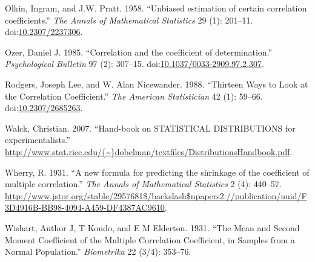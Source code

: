 \documentclass[]{article}
\begin{document}
\hypertarget{ref-Olkin1958}{}
Olkin, Ingram, and J.W. Pratt. 1958. ``Unbiased estimation of certain
correlation coefficients.'' \emph{The Annals of Mathematical Statistics}
29 (1): 201--11.
doi:\href{https://doi.org/10.2307/2237306}{10.2307/2237306}.

\hypertarget{ref-Ozer1985}{}
Ozer, Daniel J. 1985. ``Correlation and the coefficient of
determination.'' \emph{Psychological Bulletin} 97 (2): 307--15.
doi:\href{https://doi.org/10.1037/0033-2909.97.2.307}{10.1037/0033-2909.97.2.307}.

\hypertarget{ref-Rodgers1988}{}
Rodgers, Joseph Lee, and W. Alan Nicewander. 1988. ``Thirteen Ways to
Look at the Correlation Coefficient.'' \emph{The American Statistician}
42 (1): 59--66.
doi:\href{https://doi.org/10.2307/2685263}{10.2307/2685263}.

\hypertarget{ref-Walck2007}{}
Walck, Christian. 2007. ``Hand-book on STATISTICAL DISTRIBUTIONS for
experimentalists.''
\href{http://www.stat.rice.edu/\%7B~\%7Ddobelman/textfiles/DistributionsHandbook.pdf}{http://www.stat.rice.edu/\{\textasciitilde{}\}dobelman/textfiles/DistributionsHandbook.pdf}.

\hypertarget{ref-Wherry1931}{}
Wherry, R. 1931. ``A new formula for predicting the shrinkage of the
coefficient of multiple correlation.'' \emph{The Annals of Mathematical
Statistics} 2 (4): 440--57.
\url{http://www.jstor.org/stable/2957681$/backslash$npapers2://publication/uuid/F3D4916B-BB98-4094-A459-DF4387AC9610}.

\hypertarget{ref-Wishart1931}{}
Wishart, Author J, T Kondo, and E M Elderton. 1931. ``The Mean and
Second Moment Coefficient of the Multiple Correlation Coefficient, in
Samples from a Normal Population.'' \emph{Biometrika} 22 (3/4): 353--76.
\end{document}
